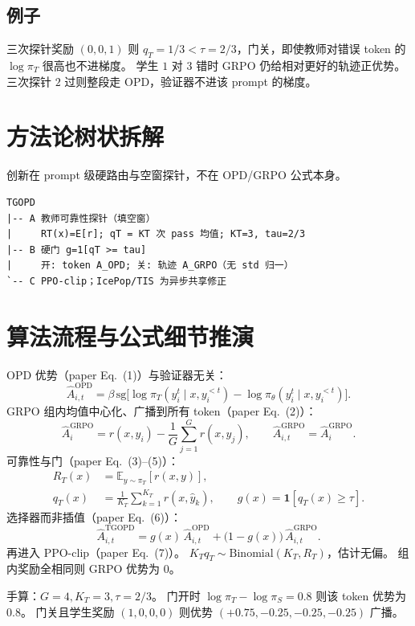 \documentclass[11pt,a4paper]{ctexart}
\begin{document}
\subsection{例子}
三次探针奖励 $(0,0,1)$ 则 $q_T=1/3<\tau=2/3$，门关，即使教师对错误 token 的 $\log\pi_T$ 很高也不进梯度。
学生 $1$ 对 $3$ 错时 GRPO 仍给相对更好的轨迹正优势。
三次探针 $2$ 过则整段走 OPD，验证器不进该 prompt 的梯度。

\section{方法论树状拆解}
创新在 prompt 级硬路由与空窗探针，不在 OPD/GRPO 公式本身。
\begin{verbatim}
TGOPD
|-- A 教师可靠性探针（填空窗）
|     RT(x)=E[r]; qT = KT 次 pass 均值; KT=3, tau=2/3
|-- B 硬门 g=1[qT >= tau]
|     开: token A_OPD; 关: 轨迹 A_GRPO（无 std 归一）
`-- C PPO-clip；IcePop/TIS 为异步共享修正
\end{verbatim}

\section{算法流程与公式细节推演}

OPD 优势（paper Eq.~(1)）与验证器无关：
\begin{equation}
\hat A^{\mathrm{OPD}}_{i,t}
=\beta\,\mathrm{sg}\Big[\log\pi_T(y_i^t\mid x,y_i^{<t})
-\log\pi_\theta(y_i^t\mid x,y_i^{<t})\Big].
\end{equation}
GRPO 组内均值中心化、广播到所有 token（paper Eq.~(2)）：
\begin{equation}
\hat A^{\mathrm{GRPO}}_i
=r(x,y_i)-\frac1G\sum_{j=1}^G r(x,y_j),\qquad
\hat A^{\mathrm{GRPO}}_{i,t}=\hat A^{\mathrm{GRPO}}_i.
\end{equation}
可靠性与门（paper Eq.~(3)--(5)）：
\begin{align}
R_T(x)&=\mathbb{E}_{y\sim\pi_T}[r(x,y)],\\
q_T(x)&=\frac1{K_T}\sum_{k=1}^{K_T}r(x,\hat y_k),\qquad
g(x)=\mathbf{1}[q_T(x)\ge\tau].
\end{align}
选择器而非插值（paper Eq.~(6)）：
\begin{equation}
\hat A^{\mathrm{TGOPD}}_{i,t}
=g(x)\,\hat A^{\mathrm{OPD}}_{i,t}
+\big(1-g(x)\big)\,\hat A^{\mathrm{GRPO}}_{i,t}.
\end{equation}
再进入 PPO-clip（paper Eq.~(7)）。
$K_T q_T\sim\mathrm{Binomial}(K_T,R_T)$，估计无偏。
组内奖励全相同则 GRPO 优势为 $0$。

手算：$G=4,K_T=3,\tau=2/3$。
门开时 $\log\pi_T-\log\pi_S=0.8$ 则该 token 优势为 $0.8$。
门关且学生奖励 $(1,0,0,0)$ 则优势 $(+0.75,-0.25,-0.25,-0.25)$ 广播。
\end{document}
